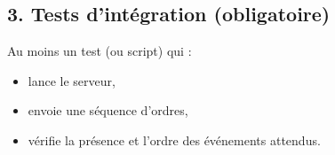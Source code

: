 \documentclass[11pt,a4paper]{article}
\begin{document}
\subsection*{3. Tests d’intégration (obligatoire)}
Au moins un test (ou script) qui :
\begin{itemize}
  \item lance le serveur,
  \item envoie une séquence d’ordres,
  \item vérifie la présence et l’ordre des événements attendus.
\end{itemize}
\end{document}
